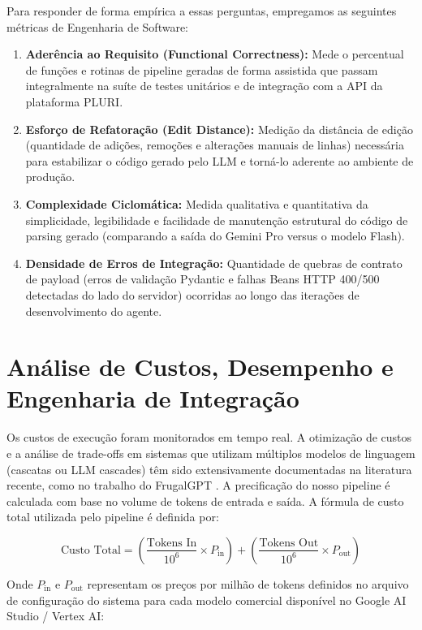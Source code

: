 \documentclass[sigconf]{acmart}
\begin{document}
Para responder de forma empírica a essas perguntas, empregamos as seguintes métricas de Engenharia de Software:
\begin{enumerate}
\item \textbf{Aderência ao Requisito (Functional Correctness):} Mede o percentual de funções e rotinas de pipeline geradas de forma assistida que passam integralmente na suíte de testes unitários e de integração com a API da plataforma PLURI.
\item \textbf{Esforço de Refatoração (Edit Distance):} Medição da distância de edição (quantidade de adições, remoções e alterações manuais de linhas) necessária para estabilizar o código gerado pelo LLM e torná-lo aderente ao ambiente de produção.
\item \textbf{Complexidade Ciclomática:} Medida qualitativa e quantitativa da simplicidade, legibilidade e facilidade de manutenção estrutural do código de parsing gerado (comparando a saída do Gemini Pro versus o modelo Flash).
\item \textbf{Densidade de Erros de Integração:} Quantidade de quebras de contrato de payload (erros de validação Pydantic e falhas Beans HTTP 400/500 detectadas do lado do servidor) ocorridas ao longo das iterações de desenvolvimento do agente.
\end{enumerate}

\section{Análise de Custos, Desempenho e Engenharia de Integração}
Os custos de execução foram monitorados em tempo real. A otimização de custos e a análise de trade-offs em sistemas que utilizam múltiplos modelos de linguagem (cascatas ou LLM cascades) têm sido extensivamente documentadas na literatura recente, como no trabalho do FrugalGPT \cite{chen2024frugalgpt}. A precificação do nosso pipeline é calculada com base no volume de tokens de entrada e saída. A fórmula de custo total utilizada pelo pipeline é definida por:

\begin{equation}
\text{Custo Total} = \left( \frac{\text{Tokens In}}{10^6} \times P_{\text{in}} \right) + \left( \frac{\text{Tokens Out}}{10^6} \times P_{\text{out}} \right)
\end{equation}

Onde $P_{\text{in}}$ e $P_{\text{out}}$ representam os preços por milhão de tokens definidos no arquivo de configuração do sistema para cada modelo comercial disponível no Google AI Studio / Vertex AI:
\end{document}
